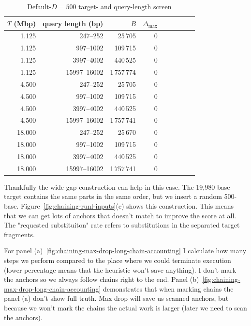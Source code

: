 \begin{table}[H]
\centering
\footnotesize
\setlength{\tabcolsep}{2.5pt}
\renewcommand{\arraystretch}{1.05}
\begin{tabular}{@{}rrrrrrrrr@{}}
\toprule
\(T\) (Mbp) & query length (bp) & \(B\) & \(\Delta_{\max}\) \\
\midrule
1.125  & 247--252      & 25\,705    & 0 \\
1.125  & 997--1002     & 109\,715   & 0 \\
1.125  & 3997--4002    & 440\,525   & 0 \\
1.125  & 15997--16002  & 1\,757\,774 & 0 \\
\midrule
4.500  & 247--252      & 25\,705    & 0 \\
4.500  & 997--1002     & 109\,715   & 0 \\
4.500  & 3997--4002    & 440\,525   & 0 \\
4.500  & 15997--16002  & 1\,757\,741 & 0 \\
\midrule
18.000 & 247--252      & 25\,670    & 0 \\
18.000 & 997--1002     & 109\,715   & 0 \\
18.000 & 3997--4002    & 440\,525   & 0 \\
18.000 & 15997--16002  & 1\,757\,741 & 0 \\
\bottomrule
\end{tabular}
\caption{Default-\(D=500\) target- and query-length screen}
\label{tab:chaining-max-drop-length-screen}
\end{table}

Thankfully the wide-gap construction can help in this case. The 19,980-base target contains the
same parts in the same order, but we insert a random 500-base. Figure~\ref{fig:chaining-runl-inputs}(e) shows this
construction. This means that we can get lots of anchors that doesn't match to improve the score at all. The "requested substituiton" rate refers to substitutions in the separated target fragments.

For panel (a)~\ref{fig:chaining-max-drop-long-chain-accounting} I calculate how many steps we perform compared to the place where we could terminate execution (lower percentage means that the heuristic won't save anything). I don't mark the anchors so we always follow chains right to the end.
Panel (b)~\ref{fig:chaining-max-drop-long-chain-accounting} demonstrates that when marking chains the panel (a) don't show full truth. Max drop will save us scanned anchors, but because we won't mark the chains the actual work is larger (later we need to scan the anchors).

